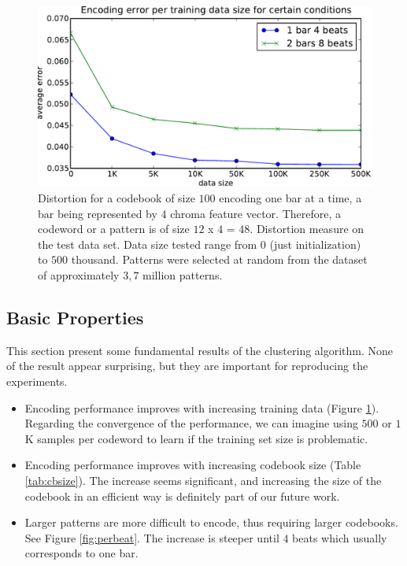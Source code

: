\documentclass{article}
\begin{document}
\begin{figure}[htb]
\begin{center}
\includegraphics[width=.8\columnwidth]{data_sizes}
\end{center}
\caption{\small{Distortion for a codebook of size $100$ encoding one bar
at a time, a bar being represented by $4$ chroma feature vector.
Therefore, a codeword or a pattern is of size $12$ x $4$ = $48$.
Distortion measure on the test data set. Data size tested range
from $0$ (just initialization) to $500$ thousand. Patterns were selected at
random from the dataset of approximately $3,7$ million patterns.
}}
\label{fig:data_sizes}
\end{figure}


\subsection{Basic Properties}
This section present some fundamental results of the clustering algorithm.
None of the result appear surprising,  but they are important for 
reproducing the experiments.
\begin{itemize}
\item Encoding performance improves with increasing training data (Figure
\ref{fig:data_sizes}). Regarding the convergence of the performance,
we can imagine using $500$ or $1$K samples per codeword to learn if the
training set size is problematic.
\item Encoding performance improves with increasing codebook size
(Table \ref{tab:cbsize}). The increase seems significant, and
increasing the size of the codebook in an efficient way
is definitely part of our future work.
\item Larger patterns are more difficult to encode, thus requiring
larger codebooks. See Figure \ref{fig:perbeat}. The increase is steeper
until $4$ beats which usually corresponds to one bar.
\end{itemize}
\end{document}
